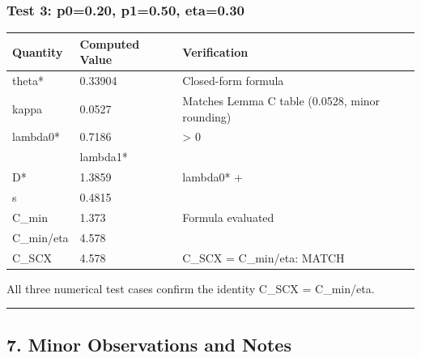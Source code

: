 \documentclass[
  12pt,
]{article}
\begin{document}
\subsubsection{Test 3: p0=0.20, p1=0.50,
eta=0.30}\label{test-3-p00.20-p10.50-eta0.30}

\begin{longtable}[]{@{}lll@{}}
\toprule\noalign{}
Quantity & Computed Value & Verification \\
\midrule\noalign{}
\endhead
\bottomrule\noalign{}
\endlastfoot
theta* & 0.33904 & Closed-form formula \\
kappa & 0.0527 & Matches Lemma C table (0.0528, minor rounding) \\
lambda0* & 0.7186 & \textgreater{} 0 \\
& lambda1* & \\
D* & 1.3859 & lambda0* + \\
s & 0.4815 & \\
C\_min & 1.373 & Formula evaluated \\
C\_min/eta & 4.578 & \\
C\_SCX & 4.578 & C\_SCX = C\_min/eta: MATCH \\
\end{longtable}

All three numerical test cases confirm the identity C\_SCX = C\_min/eta.

\begin{center}\rule{0.5\linewidth}{0.5pt}\end{center}

\subsection{7. Minor Observations and
Notes}\label{minor-observations-and-notes}
\end{document}
